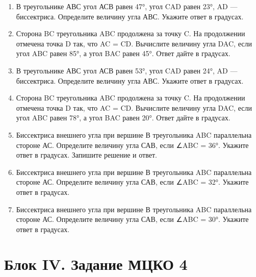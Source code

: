 \documentclass[a4paper,12pt]{article}
\newcommand{\taskspace}{\par\vspace{0.42cm}}
\begin{document}
\begin{enumerate}[resume]
\taskspace

\item В треугольнике АВС угол АСВ равен 47°, угол CAD равен 23°, AD --- биссектриса. Определите величину угла АВС. Укажите ответ в градусах.

\taskspace

\item Сторона BC треугольника ABC продолжена за точку C. На продолжении отмечена точка D так, что AC = CD. Вычислите величину угла DAC, если угол ABC равен 85°, а угол BAC равен 45°. Ответ дайте в градусах.

\taskspace

\item В треугольнике АВС угол АСВ равен 53°, угол CAD равен 24°, AD --- биссектриса. Определите величину угла АВС. Укажите ответ в градусах.

\taskspace

\item Сторона BC треугольника ABC продолжена за точку C. На продолжении отмечена точка D так, что AC = CD. Вычислите величину угла DAC, если угол ABC равен 78°, а угол BAC равен 20°. Ответ дайте в градусах.

\taskspace

\item Биссектриса внешнего угла при вершине В треугольника ABC параллельна стороне АС. Определите величину угла САВ, если ∠ABC = 36°. Укажите ответ в градусах. Запишите решение и ответ.

\taskspace

\item Биссектриса внешнего угла при вершине В треугольника ABC параллельна стороне АС. Определите величину угла САВ, если ∠ABC = 32°. Укажите ответ в градусах.

\taskspace

\item Биссектриса внешнего угла при вершине В треугольника ABC параллельна стороне АС. Определите величину угла САВ, если ∠ABC = 30°. Укажите ответ в градусах.

\taskspace

\end{enumerate}

\newpage

\section*{Блок IV. Задание МЦКО 4}
\end{document}
